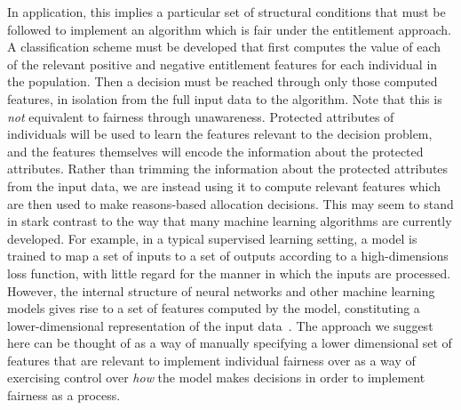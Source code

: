 In application, this implies a particular set of structural conditions that must
be followed to implement an algorithm which is fair under the entitlement
approach. A classification scheme must be developed that first computes the
value of each of the relevant positive and negative entitlement features for
each individual in the population. Then a decision must be reached through only
those computed features, in isolation from the full input data to the algorithm.
Note that this is \emph{not} equivalent to fairness through unawareness.
Protected attributes of individuals will be used to learn the features relevant
to the decision problem, and the features themselves will encode the information
about the protected attributes. Rather than trimming the information about the
protected attributes from the input data, we are instead using it to compute 
relevant features which are then used to make reasons-based allocation decisions.
This may seem to stand in stark contrast to the way that many machine learning
algorithms are currently developed. For example, in a typical supervised
learning setting, a model is trained to map a set of inputs to a set of outputs
according to a high-dimensions loss function, with little regard for the
manner in which the inputs are processed. However, the internal structure of
neural networks and other machine learning models gives rise to a set of
features computed by the model, constituting a lower-dimensional representation
of the input data~\citep{Liu_2018}. The approach we suggest here can be thought
of as a way of manually specifying a lower dimensional set of features that
are relevant to implement individual fairness over as a way of
exercising control over \emph{how} the model makes decisions in order to
implement fairness as a process.

